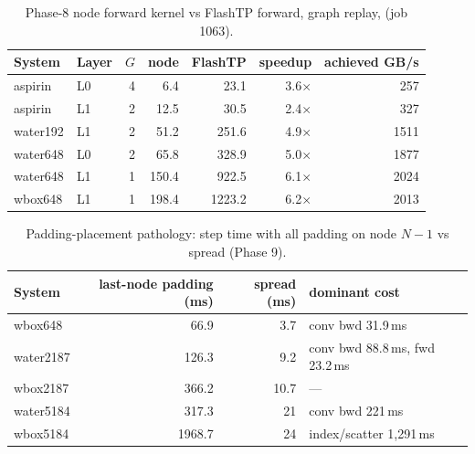 \begin{table}[H]
\centering
\caption{Phase-8 node forward kernel vs FlashTP forward, graph replay, \us{} (job 1063).}
\small
\begin{tabular}{llrrrrr}
\toprule
System & Layer & $G$ & node & FlashTP & speedup & achieved GB/s \\
\midrule
aspirin & L0 & 4 & 6.4 & 23.1 & 3.6$\times$ & 257 \\
aspirin & L1 & 2 & 12.5 & 30.5 & 2.4$\times$ & 327 \\
water192 & L1 & 2 & 51.2 & 251.6 & 4.9$\times$ & 1511 \\
water648 & L0 & 2 & 65.8 & 328.9 & 5.0$\times$ & 1877 \\
water648 & L1 & 1 & 150.4 & 922.5 & 6.1$\times$ & 2024 \\
wbox648 & L1 & 1 & 198.4 & 1223.2 & 6.2$\times$ & 2013 \\
\bottomrule
\end{tabular}
\end{table}

\begin{table}[H]
\centering
\caption{Padding-placement pathology: step time with all padding on node $N-1$ vs spread (Phase 9).}
\small
\begin{tabular}{lrrl}
\toprule
System & last-node padding (ms) & spread (ms) & dominant cost \\
\midrule
wbox648 & 66.9 & 3.7 & conv bwd 31.9\,ms \\
water2187 & 126.3 & 9.2 & conv bwd 88.8\,ms, fwd 23.2\,ms \\
wbox2187 & 366.2 & 10.7 & --- \\
water5184 & 317.3 & 21 & conv bwd 221\,ms \\
wbox5184 & 1968.7 & 24 & index/scatter 1{,}291\,ms \\
\bottomrule
\end{tabular}
\end{table}
